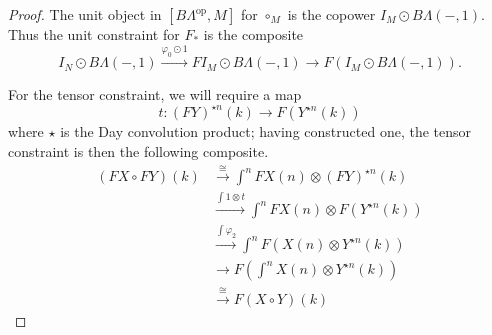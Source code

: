 \begin{proof}
The unit object in $[B\Lambda^{\textrm{op}}, M]$ for $\circ_{M}$ is the copower $I_{M} \odot B\Lambda(-,1)$. Thus the unit constraint for $F_{*}$ is the composite
  \[
    I_{N} \odot B\Lambda(-,1) \stackrel{\varphi_{0} \odot 1}{\longrightarrow} FI_{M} \odot B\Lambda(-,1) \rightarrow F(I_{M} \odot B\Lambda(-,1) ).
  \]

For the tensor constraint, we will require a map
  \[
    t \colon (FY)^{\star n}(k) \rightarrow F\left(Y^{\star n}(k)\right)
  \]
 where $\star$ is the Day convolution product; having constructed one, the tensor constraint is then the following composite.
  \begin{align*}
    (FX \circ FY)(k)  &\xrightarrow{\cong} \int^{n} FX(n) \otimes (FY)^{\star n}(k) \\
    &\xrightarrow{\int 1 \otimes t} \int^{n} FX(n) \otimes F(Y^{\star n}(k)) \\
    &\xrightarrow{\int \varphi_2} \int^{n} F(X(n) \otimes Y^{\star n}(k)) \\
    &\longrightarrow F \left(\int^{n} X(n) \otimes Y^{\star n}(k)\right) \\
    &\xrightarrow{\cong} F(X \circ Y)(k)
  \end{align*}


\end{proof}
